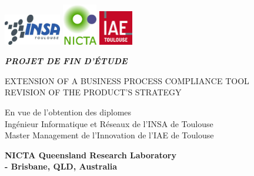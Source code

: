 \documentclass[10pt]{article}
\begin{document}
\setlength{\parindent}{1em}
\def\labelitemi{--} %

\begin{titlepage}

\begin{center}

\includegraphics[width=2.5cm]{INSA-logo.jpg} \hspace{3cm}
\includegraphics[width=1.5cm]{NICTA-logo.jpg}\hspace{4cm}
\includegraphics[width=1.5cm]{IAE-logo.jpg} 

\vspace{3cm}
\textsc{\LARGE \textit{\textbf{\uppercase{Projet de fin d'étude}}}}
\vspace{1.5cm}

\begin{framed}
\LARGE \uppercase{Extension of a Business Process Compliance tool\\Revision of the Product's Strategy}
\end{framed}

\vspace{1cm}
\large En vue de l'obtention des diplomes \\
Ingénieur Informatique et Réseaux de l'INSA de Toulouse\\
Master Management de l'Innovation de l'IAE de Toulouse

\end{center}
\vspace{1.5cm}
\begin{flushright}
\textbf{\large  NICTA Queensland Research Laboratory\\ \hspace{.5cm}- Brisbane, QLD, Australia}
\end{flushright}


\end{titlepage}
\end{document}
